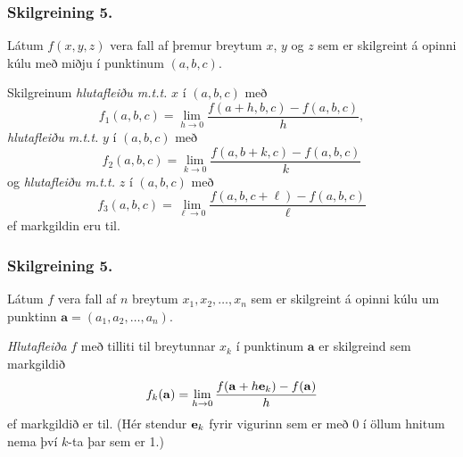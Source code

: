 \newpage

\subsubsection{Skilgreining 5.}
  
Látum $f(x,y,z)$ vera fall af þremur breytum $x$, $y$ og $z$ sem er skilgreint á opinni kúlu með miðju í punktinum $(a, b,c)$. 

\medskip

Skilgreinum \emph{hlutafleiðu m.t.t.} $x$ í $(a,b,c)$ með
$$f_1(a,b,c)=\lim_{h\rightarrow 0}\frac{f(a+h,b,c)-f(a,b,c)}{h},$$
 \emph{hlutafleiðu m.t.t.} $y$ í $(a,b,c)$ með
$$f_2(a,b,c)=\lim_{k\rightarrow 0}\frac{f(a,b+k,c)-f(a,b,c)}{k}$$
og  \emph{hlutafleiðu m.t.t.} $z$ í $(a,b,c)$ með
$$f_3(a,b,c)=\lim_{\ell\rightarrow 0}\frac{f(a,b,c+\ell)-f(a,b,c)}{\ell}$$
ef markgildin eru til.
 


\subsubsection{Skilgreining 5.}
Látum $f$ vera fall af
$n$ breytum $x_1,x_2,\ldots,x_n$ sem er skilgreint á opinni kúlu um punktinn $\mathbf{a}=(a_1, a_2, \ldots, a_n).$ 

\medskip	
{\em Hlutafleiða} $f$ með
tilliti til breytunnar $x_k$ í punktinum $\mathbf{a}$ er skilgreind sem markgildið 
$$f_k(\mathbf{a})=\lim_{h\rightarrow 0}\frac{f(\mathbf{a}+h\mbox{${\bf e}$}_k)-f(\mathbf{a})}{h}$$
ef markgildið er til.  (Hér stendur $\mbox{${\bf e}$}_k$ fyrir vigurinn sem er með
0 í öllum hnitum nema því $k$-ta þar sem er 1.)








\subsection{}



